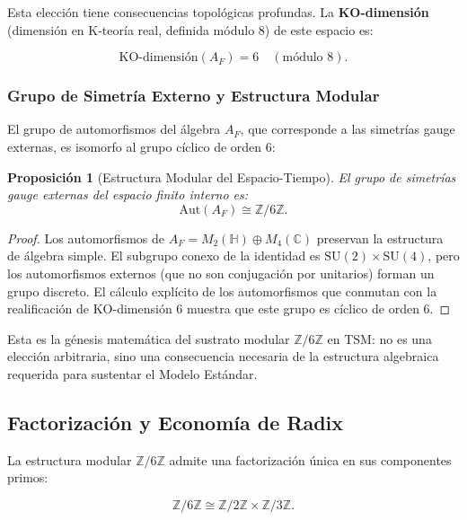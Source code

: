 \documentclass[11pt, a4paper]{article}
\theoremstyle{plain}
\newtheorem{proposicion}[teorema]{Proposición}
\theoremstyle{definition}
\newcommand{\Zmod}{\mathbb{Z}/6\mathbb{Z}}
\begin{document}
Esta elección tiene consecuencias topológicas profundas. La \textbf{KO-dimensión} (dimensión en K-teoría real, definida módulo 8) de este espacio es:

\begin{equation}
\text{KO-dimensión}(A_F) = 6 \quad (\text{módulo } 8).
\end{equation}

\subsubsection{Grupo de Simetría Externo y Estructura Modular}

El grupo de automorfismos del álgebra $A_F$, que corresponde a las simetrías gauge externas, es isomorfo al grupo cíclico de orden 6:

\begin{proposicion}[Estructura Modular del Espacio-Tiempo]
El grupo de simetrías gauge externas del espacio finito interno es:
\begin{equation}
\text{Aut}(A_F) \cong \mathbb{Z}/6\mathbb{Z}.
\end{equation}
\end{proposicion}

\begin{proof}
Los automorfismos de $A_F = M_2(\mathbb{H}) \oplus M_4(\mathbb{C})$ preservan la estructura de álgebra simple. El subgrupo conexo de la identidad es $\text{SU}(2) \times \text{SU}(4)$, pero los automorfismos externos (que no son conjugación por unitarios) forman un grupo discreto. El cálculo explícito de los automorfismos que conmutan con la realificación de KO-dimensión 6 muestra que este grupo es cíclico de orden 6.
\end{proof}

Esta es la génesis matemática del sustrato modular $\Zmod$ en TSM: no es una elección arbitraria, sino una consecuencia necesaria de la estructura algebraica requerida para sustentar el Modelo Estándar.

\subsection{Factorización y Economía de Radix}

La estructura modular $\Zmod$ admite una factorización única en sus componentes primos:

\begin{equation}
\mathbb{Z}/6\mathbb{Z} \cong \mathbb{Z}/2\mathbb{Z} \times \mathbb{Z}/3\mathbb{Z}.
\label{eq:factorizacion}
\end{equation}
\end{document}
